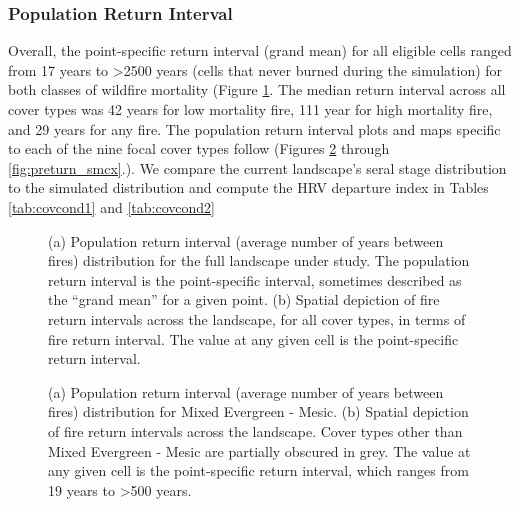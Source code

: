 \subsubsection{Population Return Interval}
Overall, the point-specific return interval (grand mean) for all eligible cells ranged from 17 years to \textgreater 2500 years (cells that never burned during the simulation) for both classes of wildfire mortality (Figure \ref{fig:preturn}. The median return interval across all cover types was 42 years for low mortality fire, 111 year for high mortality fire, and 29 years for any fire. The population return interval plots and maps specific to each of the nine focal cover types follow (Figures \ref{fig:preturn_megm} through \ref{fig:preturn_smcx}.). We compare the current landscape's seral stage distribution to the simulated distribution and compute the HRV departure index in Tables \ref{tab:covcond1} and \ref{tab:covcond2}

\begin{figure}[!htbp]
  \centering
  \qquad
  \caption{(a) Population return interval (average number of years between fires) distribution for the full landscape under study. The population return interval is the point-specific interval, sometimes described as the ``grand mean'' for a given point. (b) Spatial depiction of fire return intervals across the landscape, for all cover types, in terms of fire return interval. The value at any given cell is the point-specific return interval.}
  \label{fig:preturn}
\end{figure}


\begin{figure}[!htbp]
  \centering
  \caption{(a) Population return interval (average number of years between fires) distribution for Mixed Evergreen - Mesic. (b) Spatial depiction of fire return intervals across the landscape. Cover types other than Mixed Evergreen - Mesic are partially obscured in grey. The value at any given cell is the point-specific return interval, which ranges from 19 years to \textgreater 500 years.}
    \label{fig:preturn_megm}
\end{figure}

